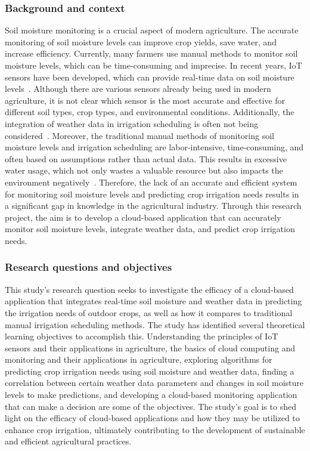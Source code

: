 \documentclass[11pt]{scrartcl} %
\begin{document}
\subsubsection{Background and context}
Soil moisture monitoring is a crucial aspect of modern agriculture. The accurate monitoring of soil moisture levels can improve crop yields, save water, and increase efficiency. Currently, many farmers use manual methods to monitor soil moisture levels, which can be time-consuming and imprecise. In recent years, IoT sensors have been developed, which can provide real-time data on soil moisture levels~\parencite{bwambale2022smart}.
\newline Although there are various sensors already being used in modern agriculture, it is not clear which sensor is the most accurate and effective for different soil types, crop types, and environmental conditions. Additionally, the integration of weather data in irrigation scheduling is often not being considered~\parencite{nandurkar2014design}.
\newline Moreover, the traditional manual methods of monitoring soil moisture levels and irrigation scheduling are labor-intensive, time-consuming, and often based on assumptions rather than actual data. This results in excessive water usage, which not only wastes a valuable resource but also impacts the environment negatively~\parencite{bwambale2022smart}.
\newline Therefore, the lack of an accurate and efficient system for monitoring soil moisture levels and predicting crop irrigation needs results in a significant gap in knowledge in the agricultural industry. Through this research project, the aim is to develop a cloud-based application that can accurately monitor soil moisture levels, integrate weather data, and predict crop irrigation needs.

\subsubsection{Research questions and objectives}
This study's research question seeks to investigate the efficacy of a cloud-based application that integrates real-time soil moisture and weather data in predicting the irrigation needs of outdoor crops, as well as how it compares to traditional manual irrigation scheduling methods. The study has identified several theoretical learning objectives to accomplish this.
\newline Understanding the principles of IoT sensors and their applications in agriculture, the basics of cloud computing and monitoring and their applications in agriculture, exploring algorithms for predicting crop irrigation needs using soil moisture and weather data, finding a correlation between certain weather data parameters and changes in soil moisture levels to make predictions, and developing a cloud-based monitoring application that can make a decision are some of the objectives. The study's goal is to shed light on the efficacy of cloud-based applications and how they may be utilized to enhance crop irrigation, ultimately contributing to the development of sustainable and efficient agricultural practices.
\end{document}
